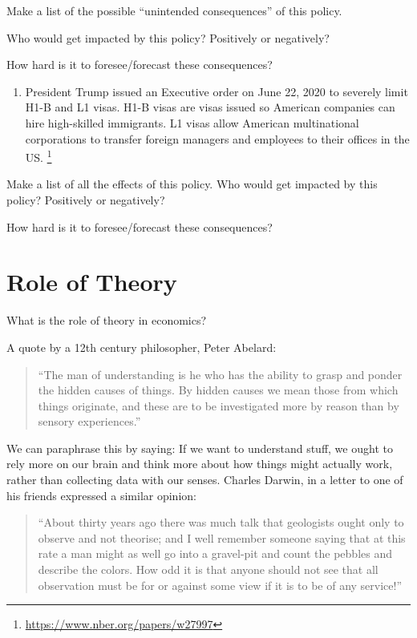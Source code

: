 \documentclass[
]{book}
\providecommand{\tightlist}{%
  \setlength{\itemsep}{0pt}\setlength{\parskip}{0pt}}
\begin{document}
Make a list of the possible ``unintended consequences'' of this policy.

Who would get impacted by this policy? Positively or negatively?

How hard is it to foresee/forecast these consequences?

\begin{enumerate}
\def\labelenumi{\arabic{enumi}.}
\setcounter{enumi}{1}
\tightlist
\item
  President Trump issued an Executive order on June 22, 2020 to severely limit H1-B and L1 visas. H1-B visas are visas issued so American companies can hire high-skilled immigrants. L1 visas allow American multinational corporations to transfer foreign managers and employees to their offices in the US. \footnote{\url{https://www.nber.org/papers/w27997}}
\end{enumerate}

Make a list of all the effects of this policy. Who would get impacted by this policy? Positively or negatively?

How hard is it to foresee/forecast these consequences?

\hypertarget{role-of-theory}{%
\section{Role of Theory}\label{role-of-theory}}

What is the role of theory in economics?

A quote by a 12th century philosopher, Peter Abelard:

\begin{quote}
``The man of understanding is he who has the ability to grasp and ponder the hidden causes of things. By hidden causes we mean those from which things originate, and these are to be investigated more by reason than by sensory experiences.''
\end{quote}

We can paraphrase this by saying: If we want to understand stuff, we ought to rely more on our brain and think more about how things might actually work, rather than collecting data with our senses.
Charles Darwin, in a letter to one of his friends expressed a similar opinion:

\begin{quote}
``About thirty years ago there was much talk that geologists ought only to observe and not theorise; and I well remember someone saying that at this rate a man might as well go into a gravel-pit and count the pebbles and describe the colors. How odd it is that anyone should not see that all observation must be for or against some view if it is to be of any service!''
\end{quote}
\end{document}

